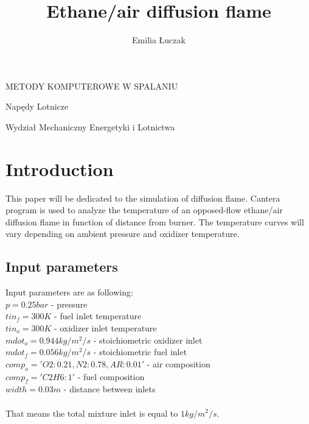 \documentclass[a4paper]{article}
\title{Ethane/air diffusion flame}
\author{Emilia Łuczak}
\date{}
\newcommand{\sepspace}{\vspace*{1em}}
\begin{document}
\maketitle
\sepspace
 \begin{centering}
 METODY KOMPUTEROWE W SPALANIU\\
 \end{centering}
 \sepspace
 \sepspace
 \sepspace
 \sepspace
 \sepspace
 \sepspace
 \sepspace
 \sepspace
 \sepspace
 \sepspace
 \sepspace
 \sepspace
 \sepspace
 \sepspace
 \sepspace
 \sepspace
 \sepspace
 \sepspace
 \sepspace
 \sepspace
 \sepspace
 \sepspace
 \sepspace
 \sepspace
 \sepspace
 \sepspace
 \sepspace
 \sepspace
 \sepspace
 \sepspace
 \sepspace
 \sepspace
 \sepspace
 \sepspace
 \sepspace
 \sepspace
 \sepspace
 \sepspace
 \sepspace
 \sepspace
 \sepspace
 \sepspace
 \sepspace
 \sepspace
 \sepspace
 
 
 \begin{centering}
 Napędy Lotnicze\\
 \end{centering}
 \begin{centering}
 Wydział Mechaniczny Energetyki i Lotnictwa\\
 \end{centering}


\pagebreak
\section{Introduction}

This paper will be dedicated to the simulation of diffusion flame. Cantera program is used to analyze the temperature of an opposed-flow ethane/air diffusion flame in function of distance from burner. The temperature curves will vary depending on ambient pressure and oxidizer temperature. \\
\subsection{Input parameters}
Input parameters are as following:\\
$p = 0.25 bar$ - pressure\\
$tin_f = 300 K$ - fuel inlet temperature\\
$tin_o = 300 K$  - oxidizer inlet temperature\\
$mdot_o = 0.944 kg/m^2/s$ - stoichiometric oxidizer inlet\\
$mdot_f = 0.056 kg/m^2/s$ - stoichiometric fuel inlet \\
$comp_o = 'O2:0.21, N2:0.78, AR:0.01'$  - air composition\\
$comp_f = 'C2H6:1'$  - fuel composition\\
$width = 0.03 m$ - distance between inlets\\
\\
That means the total mixture inlet is equal to $1 kg/m^2/s$.
\\
\end{document}
